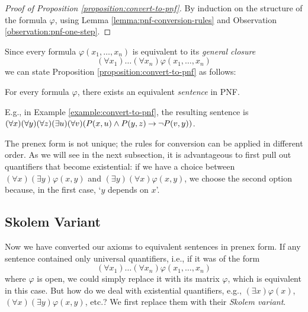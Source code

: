\begin{proof}[Proof of Proposition \ref{proposition:convert-to-pnf}]
    By induction on the structure of the formula $\varphi$, using Lemma \ref{lemma:pnf-conversion-rules} and Observation \ref{observation:pnf-one-step}.
\end{proof}

Since every formula $\varphi(x_1,\dots,x_n)$ is equivalent to its \emph{general closure} $$(\forall x_1)\dots(\forall x_n)\varphi(x_1,\dots,x_n)$$ we can state Proposition \ref{proposition:convert-to-pnf} as follows:

\begin{corollary}
    For every formula $\varphi$, there exists an equivalent \emph{sentence} in PNF.
\end{corollary} 

E.g., in Example \ref{example:convert-to-pnf}, the resulting sentence is $(\forall x)(\forall y)(\forall z)(\exists u)(\forall v)( P(x,u)\land P(y,z)\mathbin{\rightarrow}\neg P(v,y))$.

\begin{remark}
    The prenex form is not unique; the rules for conversion can be applied in different order. As we will see in the next subsection, it is advantageous to first pull out quantifiers that become existential: if we have a choice between $(\forall x)(\exists y)\varphi(x,y)$ and $(\exists y)(\forall x)\varphi(x,y)$, we choose the second option because, in the first case, `$y$ depends on $x$'.
\end{remark}

\subsection{Skolem Variant}

Now we have converted our axioms to equivalent sentences in prenex form. If any sentence contained only universal quantifiers, i.e., if it was of the form 
$$(\forall x_1)\dots(\forall x_n)\varphi(x_1,\dots,x_n)$$ 
where $\varphi$ is open, we could simply replace it with its matrix $\varphi$, which is equivalent in this case. But how do we deal with existential quantifiers, e.g., $(\exists x)\varphi(x)$, $(\forall x)(\exists y)\varphi(x,y)$, etc.? We first replace them with their \emph{Skolem variant}.

